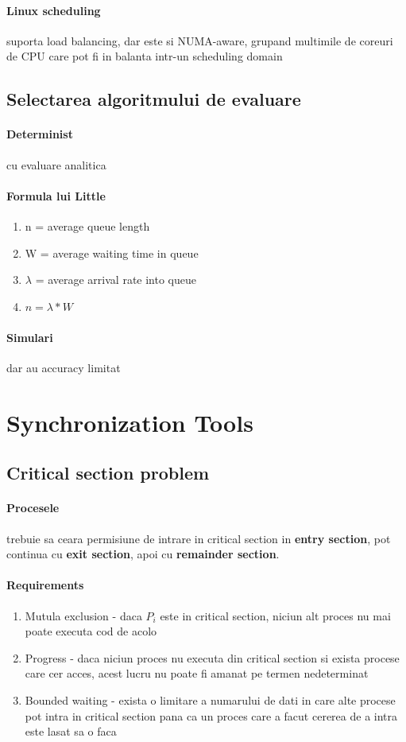 \documentclass{article}
\begin{document}
\paragraph*{Linux scheduling} suporta load balancing, dar este si NUMA-aware, grupand multimile de coreuri de CPU care pot fi in balanta intr-un scheduling domain

\subsection*{Selectarea algoritmului de evaluare}
\paragraph*{Determinist} cu evaluare analitica
\paragraph*{Formula lui Little}
\begin{enumerate}
    \item n = average queue length
    \item W = average waiting time in queue
    \item $\lambda$ = average arrival rate into queue
    \item $ n = \lambda * W$
\end{enumerate}
\paragraph*{Simulari} dar au accuracy limitat

\section[Ch6 Synchronization Tools]{Synchronization Tools}
\subsection*{Critical section problem}
\paragraph*{Procesele} trebuie sa ceara permisiune de intrare in critical section in \textbf{entry section}, pot continua cu \textbf{exit section}, apoi cu \textbf{remainder section}.
\paragraph*{Requirements}
\begin{enumerate}
    \item Mutula exclusion - daca $P_i$ este in critical section, niciun alt proces nu mai poate executa cod de acolo
    \item Progress - daca niciun proces nu executa din critical section si exista procese care cer acces, acest lucru nu poate fi amanat pe termen nedeterminat
    \item Bounded waiting - exista o limitare a numarului de dati in care alte procese pot intra in critical section pana ca un proces care a facut cererea de a intra este lasat sa o faca
\end{enumerate}
\end{document}
